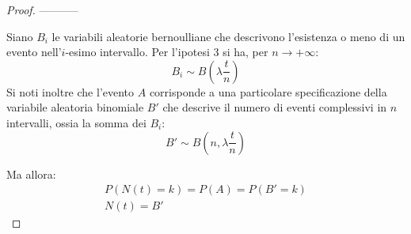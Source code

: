 \begin{proof}

-----------


	Siano $B_i$ le variabili aleatorie bernoulliane che descrivono l'esistenza o meno di un evento nell'$i$-esimo intervallo. Per l'ipotesi 3 si ha, per $n\to+\infty$:
	\begin{equation*}
		B_i \sim B\left(\lambda\frac{t}{n}\right)
	\end{equation*}
	Si noti inoltre che l'evento $A$ corrisponde a una particolare specificazione della variabile aleatoria binomiale $B'$ che descrive il numero di eventi complessivi in $n$ intervalli, ossia la somma dei $B_i$:
	\begin{equation*}
		B'\sim B\left(n, \lambda\frac{t}{n}\right)
	\end{equation*}

	Ma allora:
	\begin{gather*}
		P(N(t)=k) = P(A) = P(B'=k) \\
		N(t) = B'
	\end{gather*}

	
\end{proof}
